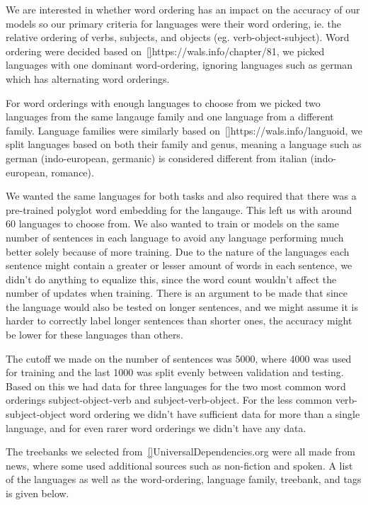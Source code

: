 We are interested in whether word ordering has an impact on the accuracy of our models so our primary criteria for languages were their word ordering, ie. the relative ordering of verbs, subjects, and objects (eg. verb-object-subject).
Word ordering were decided based on~\ref{}{https://wals.info/chapter/81}, we picked languages with one dominant word-ordering, ignoring languages such as german which has alternating word orderings. 

For word orderings with enough languages to choose from we picked two languages from the same langauge family and one language from a different family.
Language families were similarly based on~\ref{}{https://wals.info/languoid}, we split languages based on both their family and genus, meaning a language such as german (indo-european, germanic) is considered different from italian (indo-european, romance).

We wanted the same languages for both tasks and also required that there was a pre-trained polyglot word embedding for the langauge. 
This left us with around 60 languages to choose from. 
We also wanted to train or models on the same number of sentences in each language to avoid any language performing much better solely because of more training. 
Due to the nature of the languages each sentence might contain a greater or lesser amount of words in each sentence, we didn't do anything to equalize this, since the word count wouldn't affect the number of updates when training.
There is an argument to be made that since the language would also be tested on longer sentences, and we might assume it is harder to correctly label longer sentences than shorter ones, the accuracy might be lower for these languages than others. 

The cutoff we made on the number of sentences was 5000, where 4000 was used for training and the last 1000 was split evenly between validation and testing.
Based on this we had data for three languages for the two most common word orderings subject-object-verb and subject-verb-object.
For the less common verb-subject-object word ordering we didn't have sufficient data for more than a single language, and for even rarer word orderings we didn't have any data.

The treebanks we selected from~\ref{}{UniversalDependencies.org} were all made from news, where some used additional sources such as non-fiction and spoken.
A list of the languages as well as the word-ordering, language family, treebank, and tags is given below.

